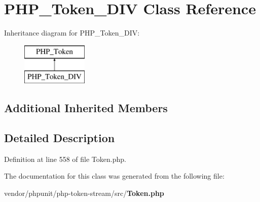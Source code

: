 \section{P\+H\+P\+\_\+\+Token\+\_\+\+D\+I\+V Class Reference}
\label{class_p_h_p___token___d_i_v}
Inheritance diagram for P\+H\+P\+\_\+\+Token\+\_\+\+D\+I\+V\+:\begin{figure}[H]
\begin{center}
\leavevmode
\includegraphics[height=2.000000cm]{class_p_h_p___token___d_i_v}
\end{center}
\end{figure}
\subsection*{Additional Inherited Members}


\subsection{Detailed Description}


Definition at line 558 of file Token.\+php.



The documentation for this class was generated from the following file\+:\begin{DoxyCompactItemize}
\item 
vendor/phpunit/php-\/token-\/stream/src/{\bf Token.\+php}\end{DoxyCompactItemize}
